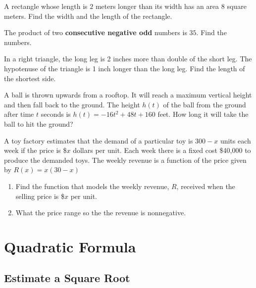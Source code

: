 \documentclass[en,12pt]{elegantbook}
\providecommand{\tightlist}{%
  \setlength{\itemsep}{0pt}\setlength{\parskip}{0pt}}
\let\BeginKnitrBlock\begin \let\EndKnitrBlock\end
\begin{document}
\BeginKnitrBlock{exercise}
\protect\hypertarget{exr:unnamed-chunk-140}{}{\label{exr:unnamed-chunk-140} }
A rectangle whose length is \(2\) meters longer than its width has an area \(8\) square meters. Find the width and the length of the rectangle.
\EndKnitrBlock{exercise}

\BeginKnitrBlock{exercise}
\protect\hypertarget{exr:unnamed-chunk-141}{}{\label{exr:unnamed-chunk-141} }
The product of two \textbf{consecutive negative odd} numbers is \(35\). Find the numbers.
\EndKnitrBlock{exercise}

\BeginKnitrBlock{exercise}
\protect\hypertarget{exr:unnamed-chunk-142}{}{\label{exr:unnamed-chunk-142} }
In a right triangle, the long leg is 2 inches more than double of the short leg. The hypotenuse of the triangle is 1 inch longer than the long leg. Find the length of the shortest side.
\EndKnitrBlock{exercise}

\BeginKnitrBlock{exercise}
\protect\hypertarget{exr:unnamed-chunk-143}{}{\label{exr:unnamed-chunk-143} }
A ball is thrown upwards from a rooftop. It will reach a maximum vertical height and then fall back to the ground. The height \(h(t)\) of the ball from the ground after time \(t\) seconds is \(h(t)=-16t^2 + 48t + 160\) feet. How long it will take the ball to hit the ground?
\EndKnitrBlock{exercise}

\BeginKnitrBlock{exercise}
\protect\hypertarget{exr:unnamed-chunk-144}{}{\label{exr:unnamed-chunk-144} }
A toy factory estimates that the demand of a particular toy is \(300 -x\) units each week if the price is \$\(x\) dollars per unit. Each week there is a fixed cost \$40,000 to produce the demanded toys.
The weekly revenue is a function of the price given by \(R(x)=x(30-x)\)

\begin{enumerate}
\def\labelenumi{\arabic{enumi}.}
\tightlist
\item
  Find the function that models the weekly revenue, \(R\), received when the selling price is \$\(x\) per unit.
\item
  What the price range so the the revenue is nonnegative.
\end{enumerate}
\EndKnitrBlock{exercise}

\hypertarget{quadratic-formula}{%
\chapter{Quadratic Formula}\label{quadratic-formula}}

\hypertarget{estimate-a-square-root}{%
\section{Estimate a Square Root}\label{estimate-a-square-root}}
\end{document}
